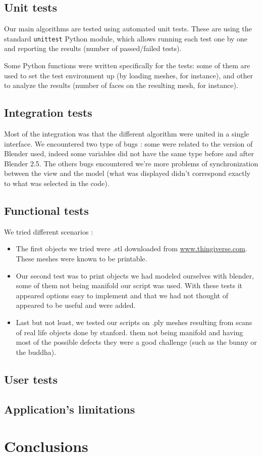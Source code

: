 \documentclass{report}
\begin{document}
\section{Unit tests}
Our main algorithms are tested using automated unit tests. These are using the standard \texttt{unittest} Python module, which allows running each test one by one and reporting the results (number of passed/failed tests).

Some Python functions were written specifically for the tests: some of them are used to set the test environment up (by loading meshes, for instance), and other to analyze the results (number of faces on the resulting mesh, for instance).

\section{Integration tests}
Most of the integration was that the different algorithm were united in a single interface. We encountered two type of bugs : some were related to the version of Blender used, indeed some variables did not have the same type before and after Blender 2.5. The others bugs encountered we're more problems of synchronization between the view and the model (what was displayed didn't correspond exactly to what was selected in the code). 

\section{Functional tests}
We tried different scenarios :
\begin{itemize}
\item The first objects we tried were .stl downloaded from \url{www.thingiverse.com}. These meshes were known to be printable.
\item Our second test was to print objects we had modeled ourselves with blender, some of them not being manifold our script was used. With these tests it appeared options easy to implement and that we had not thought of appeared to be useful and were added.
\item Last but not least, we tested our scripts on .ply meshes resulting from scans of real life objects done by stanford. them not being manifold and having most of the possible defects they were a good challenge (such as the bunny or the buddha).  
\end{itemize}

\section{User tests}

\section{Application's limitations}

\chapter{Conclusions}





\appendix
\end{document}
